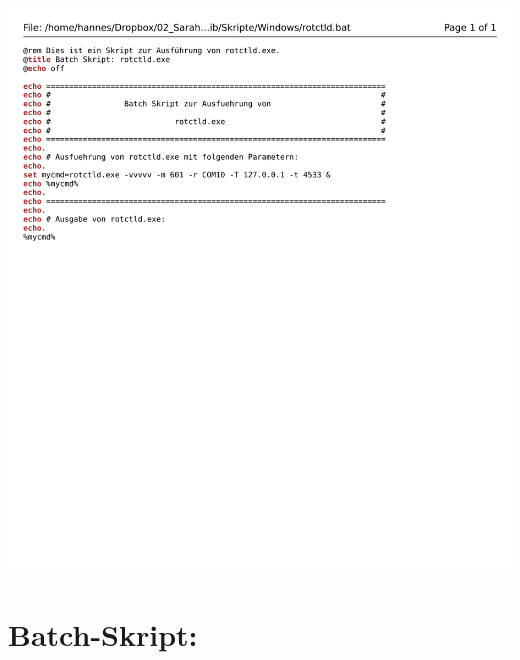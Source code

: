 \begin{center}
	\includegraphics[width=1\textwidth]{./appendicies/rotctld-windows}
\end{center}


\chapter{Batch-Skript: }
\label{chap:rigctlddummybat}

